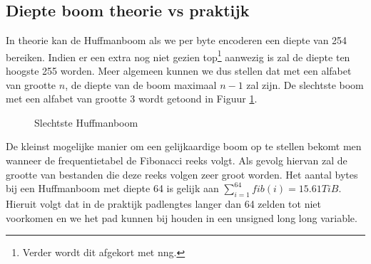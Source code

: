 \documentclass[twoside,twocolumn]{article}
\begin{document}
    \subsection{Diepte boom theorie vs praktijk}
        In theorie kan de Huffmanboom als we per byte encoderen een diepte van 254 bereiken.
        Indien er een extra nog niet gezien top\footnote{Verder wordt dit afgekort met nng.} aanwezig is zal de diepte ten hoogste 255 worden. Meer algemeen kunnen we dus stellen dat met een alfabet van grootte $n$, de diepte van de boom maximaal $n - 1$ zal zijn. De slechtste boom met een alfabet van grootte 3 wordt getoond in Figuur \ref{boom1}. 
    \begin{figure}[H]
        \begin{center}
        
        \end{center}
        \caption{Slechtste Huffmanboom}
        \label{boom1}
    \end{figure}    
    De kleinst mogelijke manier om een gelijkaardige boom op te stellen bekomt men wanneer de frequentietabel de Fibonacci reeks volgt. Als gevolg hiervan zal de grootte van bestanden die deze reeks volgen zeer groot worden. Het aantal bytes bij een Huffmanboom met diepte 64 is gelijk aan
    $\sum_{i=1}^{64} fib(i) = 15.61TiB $.
    Hieruit volgt dat in de praktijk padlengtes langer dan 64 zelden tot niet voorkomen en we het pad kunnen bij houden in een unsigned long long variable.
    
\end{document}
